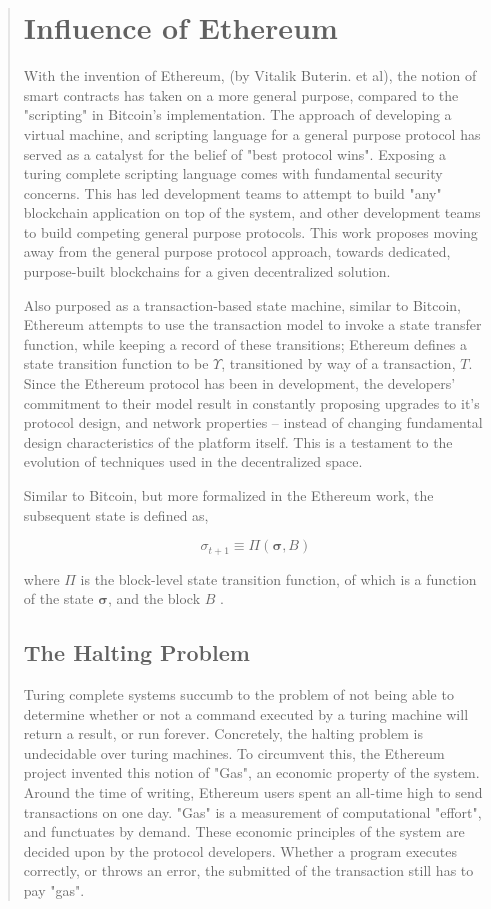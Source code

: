 \documentclass[12pt, titlepage, twocolumn]{report}
\begin{document}
\begin{quotation}
\section{Influence of Ethereum}
With the invention of Ethereum, (by Vitalik Buterin. et al), the notion of smart contracts has taken on a more general purpose, compared to the "scripting" in Bitcoin's implementation. The approach of developing a virtual machine, and scripting language for a general purpose protocol has served as a catalyst for the belief of "best protocol wins". Exposing a turing complete scripting language comes with fundamental security concerns. This has led development teams to attempt to build "any" blockchain application on top of the system, and other development teams to build competing general purpose protocols. This work proposes moving away from the general purpose protocol approach, towards dedicated, purpose-built blockchains for a given decentralized solution. 

Also purposed as a transaction-based state machine, similar to Bitcoin, Ethereum attempts to use the transaction model to invoke a state transfer function, while keeping a record of these transitions; Ethereum defines a state transition function to be \(  \Upsilon \), transitioned by way of a transaction, \(T\). Since the Ethereum protocol has been in development, the developers' commitment to their model result in constantly proposing upgrades to it's protocol design, and network properties -- instead of changing fundamental design characteristics of the platform itself. This is a testament to the evolution of techniques used in the decentralized space. 

Similar to Bitcoin, but more formalized in the Ethereum work, the subsequent state is defined as,

\begin{equation}
\sigma_{t+1} \equiv \Pi (\boldsymbol{\sigma}, B)
\end{equation}

where \(\Pi\) is the block-level state transition function, of which is a function of the state \(\boldsymbol{\sigma}\), and the block \(B\) \cite{yellowp}.


\subsection{The Halting Problem}
Turing complete systems succumb to the problem of not being able to determine whether or not a command executed by a turing machine will return a result, or run forever. Concretely, the halting problem is undecidable over turing machines. To circumvent this, the Ethereum project invented this notion of "Gas", an economic property of the system. Around the time of writing, Ethereum users spent an all-time high to send transactions on one day. "Gas" is a measurement of computational "effort", and functuates by demand. These economic principles of the system are decided upon by the protocol developers. Whether a program executes correctly, or throws an error, the submitted of the transaction still has to pay "gas". 


\end{quotation}
\end{document}
